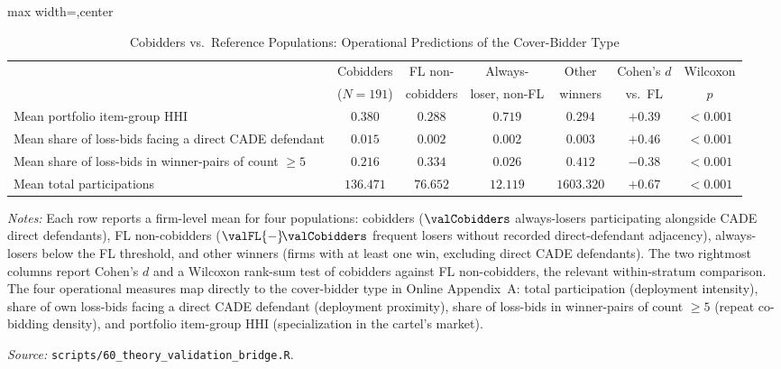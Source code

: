 \begin{table}[htbp]
\centering
\caption{Cobidders vs.\ Reference Populations: Operational Predictions of the Cover-Bidder Type}
\label{tab:theory_bridge}
\begin{adjustbox}{max width=\textwidth,center}
\begin{threeparttable}
\footnotesize
\begin{tabular}{lcccccc}
\toprule
 & Cobidders & FL non- & Always- & Other & Cohen's $d$ & Wilcoxon \\
 & ($N=191$) & cobidders & loser, non-FL & winners & vs.\ FL & $p$ \\
\midrule
Mean portfolio item-group HHI & $0.380$ & $0.288$ & $0.719$ & $0.294$ & $+0.39$ & $<0.001$ \\
Mean share of loss-bids facing a direct CADE defendant & $0.015$ & $0.002$ & $0.002$ & $0.003$ & $+0.46$ & $<0.001$ \\
Mean share of loss-bids in winner-pairs of count $\geq 5$ & $0.216$ & $0.334$ & $0.026$ & $0.412$ & $-0.38$ & $<0.001$ \\
Mean total participations & $136.471$ & $76.652$ & $12.119$ & $1603.320$ & $+0.67$ & $<0.001$ \\
\bottomrule
\end{tabular}
\begin{tablenotes}
\footnotesize
\item \textit{Notes:} Each row reports a firm-level mean for four populations: cobidders ($\valCobidders$ always-losers participating alongside CADE direct defendants), FL non-cobidders ($\valFL{-}\!\valCobidders$ frequent losers without recorded direct-defendant adjacency), always-losers below the FL threshold, and other winners (firms with at least one win, excluding direct CADE defendants). The two rightmost columns report Cohen's $d$ and a Wilcoxon rank-sum test of cobidders against FL non-cobidders, the relevant within-stratum comparison. The four operational measures map directly to the cover-bidder type in Online Appendix~A: total participation (deployment intensity), share of own loss-bids facing a direct CADE defendant (deployment proximity), share of loss-bids in winner-pairs of count $\geq 5$ (repeat co-bidding density), and portfolio item-group HHI (specialization in the cartel's market).
\item \textit{Source:} \texttt{scripts/60\_theory\_validation\_bridge.R}.
\end{tablenotes}
\end{threeparttable}
\end{adjustbox}
\end{table}
